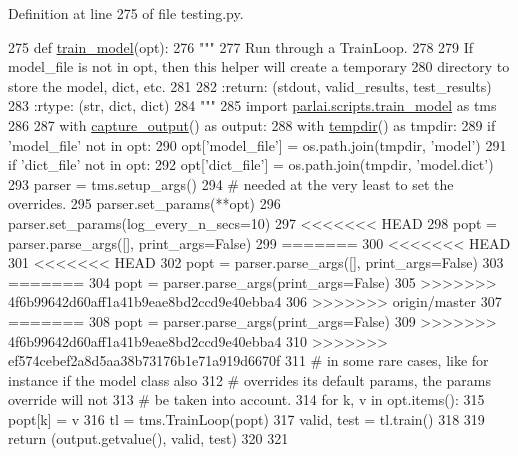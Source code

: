 Definition at line 275 of file testing.\+py.


\begin{DoxyCode}
275 \textcolor{keyword}{def }\hyperlink{namespaceparlai_1_1utils_1_1testing_a005734981469efed8a992bf5edc3ca8a}{train\_model}(opt):
276     \textcolor{stringliteral}{"""}
277 \textcolor{stringliteral}{    Run through a TrainLoop.}
278 \textcolor{stringliteral}{}
279 \textcolor{stringliteral}{    If model\_file is not in opt, then this helper will create a temporary}
280 \textcolor{stringliteral}{    directory to store the model, dict, etc.}
281 \textcolor{stringliteral}{}
282 \textcolor{stringliteral}{    :return: (stdout, valid\_results, test\_results)}
283 \textcolor{stringliteral}{    :rtype: (str, dict, dict)}
284 \textcolor{stringliteral}{    """}
285     \textcolor{keyword}{import} \hyperlink{namespaceparlai_1_1scripts_1_1train__model}{parlai.scripts.train\_model} \textcolor{keyword}{as} tms
286 
287     with \hyperlink{namespaceparlai_1_1utils_1_1testing_ab00d4d693202afab92c06387aa50699b}{capture\_output}() \textcolor{keyword}{as} output:
288         with \hyperlink{namespaceparlai_1_1utils_1_1testing_a0945b769a10c0c844b29c02ff26445a5}{tempdir}() \textcolor{keyword}{as} tmpdir:
289             \textcolor{keywordflow}{if} \textcolor{stringliteral}{'model\_file'} \textcolor{keywordflow}{not} \textcolor{keywordflow}{in} opt:
290                 opt[\textcolor{stringliteral}{'model\_file'}] = os.path.join(tmpdir, \textcolor{stringliteral}{'model'})
291             \textcolor{keywordflow}{if} \textcolor{stringliteral}{'dict\_file'} \textcolor{keywordflow}{not} \textcolor{keywordflow}{in} opt:
292                 opt[\textcolor{stringliteral}{'dict\_file'}] = os.path.join(tmpdir, \textcolor{stringliteral}{'model.dict'})
293             parser = tms.setup\_args()
294             \textcolor{comment}{# needed at the very least to set the overrides.}
295             parser.set\_params(**opt)
296             parser.set\_params(log\_every\_n\_secs=10)
297 <<<<<<< HEAD
298             popt = parser.parse\_args([], print\_args=\textcolor{keyword}{False})
299 =======
300 <<<<<<< HEAD
301 <<<<<<< HEAD
302             popt = parser.parse\_args([], print\_args=\textcolor{keyword}{False})
303 =======
304             popt = parser.parse\_args(print\_args=\textcolor{keyword}{False})
305 >>>>>>> 4f6b99642d60aff1a41b9eae8bd2ccd9e40ebba4
306 >>>>>>> origin/master
307 =======
308             popt = parser.parse\_args(print\_args=\textcolor{keyword}{False})
309 >>>>>>> 4f6b99642d60aff1a41b9eae8bd2ccd9e40ebba4
310 >>>>>>> ef574cebef2a8d5aa38b73176b1e71a919d6670f
311             \textcolor{comment}{# in some rare cases, like for instance if the model class also}
312             \textcolor{comment}{# overrides its default params, the params override will not}
313             \textcolor{comment}{# be taken into account.}
314             \textcolor{keywordflow}{for} k, v \textcolor{keywordflow}{in} opt.items():
315                 popt[k] = v
316             tl = tms.TrainLoop(popt)
317             valid, test = tl.train()
318 
319     \textcolor{keywordflow}{return} (output.getvalue(), valid, test)
320 
321 
\end{DoxyCode}


